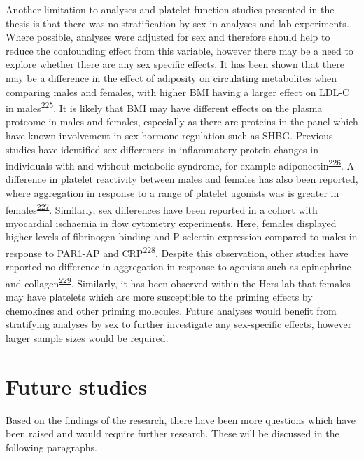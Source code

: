 \documentclass[11pt,twoside]{bristolthesis}
\begin{document}
Another limitation to analyses and platelet function studies presented in the thesis is that there was no stratification by sex in analyses and lab experiments. Where possible, analyses were adjusted for sex and therefore should help to reduce the confounding effect from this variable, however there may be a need to explore whether there are any sex specific effects. It has been shown that there may be a difference in the effect of adiposity on circulating metabolites when comparing males and females, with higher BMI having a larger effect on LDL-C in males\textsuperscript{\protect\hyperlink{ref-OKeeffe2022}{225}}. It is likely that BMI may have different effects on the plasma proteome in males and females, especially as there are proteins in the panel which have known involvement in sex hormone regulation such as SHBG. Previous studies have identified sex differences in inflammatory protein changes in individuals with and without metabolic syndrome, for example adiponectin\textsuperscript{\protect\hyperlink{ref-TerHorst2020}{226}}. A difference in platelet reactivity between males and females has also been reported, where aggregation in response to a range of platelet agonists was is greater in females\textsuperscript{\protect\hyperlink{ref-Becker2006}{227}}. Similarly, sex differences have been reported in a cohort with myocardial ischaemia in flow cytometry experiments. Here, females displayed higher levels of fibrinogen binding and P-selectin expression compared to males in response to PAR1-AP and CRP\textsuperscript{\protect\hyperlink{ref-Waissi2020}{228}}. Despite this observation, other studies have reported no difference in aggregation in response to agonists such as epinephrine and collagen\textsuperscript{\protect\hyperlink{ref-Friede2020}{229}}. Similarly, it has been observed within the Hers lab that females may have platelets which are more susceptible to the priming effects by chemokines and other priming molecules. Future analyses would benefit from stratifying analyses by sex to further investigate any sex-specific effects, however larger sample sizes would be required.

\hypertarget{future-studies}{%
\section{Future studies}\label{future-studies}}

Based on the findings of the research, there have been more questions which have been raised and would require further research. These will be discussed in the following paragraphs.
\end{document}
